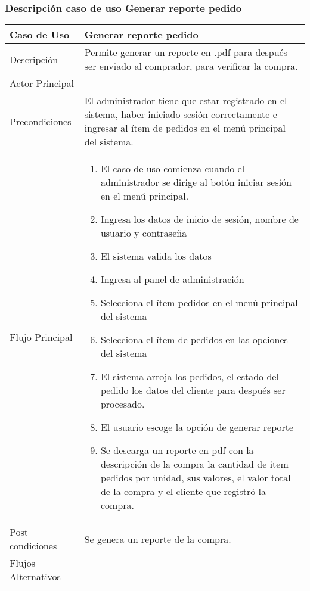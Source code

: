 \documentclass[12pt,a4paper]{article}
\begin{document}
    \newpage
\subsubsection*{Descripción caso de uso Generar reporte pedido}
\begin{table}[h]
        \centering
        \begin{tabular}{| p{3cm}| p{11cm} |} 
        \hline  
        Caso de Uso         &    \textbf{Generar reporte pedido }   \\ 
        \hline
        Descripción         &  Permite generar un reporte en .pdf para después ser enviado al comprador, para verificar la compra.     \\ 
        \hline
        Actor Principal     &      \\ 
        \hline
        Precondiciones      &    El administrador tiene que estar registrado en el sistema, haber iniciado sesión correctamente e ingresar al ítem de pedidos en el menú principal del sistema. 	\\
        \hline
        Flujo Principal     &    

            \begin{enumerate}
                \item El caso de uso comienza cuando el administrador se dirige al botón iniciar sesión en el menú principal.
                \item Ingresa los datos de inicio de sesión, nombre de usuario y contraseña
                \item El sistema valida los datos
                \item Ingresa al panel de administración
                \item Selecciona el ítem pedidos en el menú principal del sistema
                \item Selecciona el ítem de pedidos en las opciones del sistema
                \item El sistema arroja los pedidos, el estado del pedido los datos del cliente para después ser procesado.
                \item El usuario escoge la opción de generar reporte
                \item Se descarga un reporte en pdf con la descripción de la compra la cantidad de ítem pedidos por unidad, sus valores, el valor total de la compra y el cliente que registró la compra.
            \end{enumerate}
        \\  
        \hline
        Post condiciones    &   Se genera un reporte de la compra.    \\  
        \hline
        Flujos Alternativos &       \\  
        \hline
        \end{tabular}
    \end{table}
\end{document}
